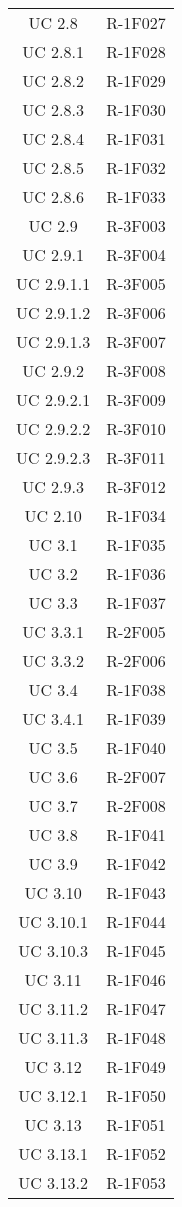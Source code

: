 \begin{tabularx}{\textwidth}{c|c}
		UC 2.8 & R-1F027 \\
		UC 2.8.1 & R-1F028 \\
		UC 2.8.2 & R-1F029 \\
		UC 2.8.3 & R-1F030 \\
		UC 2.8.4 & R-1F031 \\
		UC 2.8.5 & R-1F032 \\
		UC 2.8.6 & R-1F033 \\
		UC 2.9 & R-3F003 \\
		UC 2.9.1 & R-3F004 \\
		UC 2.9.1.1 & R-3F005 \\
		UC 2.9.1.2 & R-3F006 \\
		UC 2.9.1.3 & R-3F007 \\
		UC 2.9.2 & R-3F008 \\
		UC 2.9.2.1 & R-3F009 \\
		UC 2.9.2.2 & R-3F010 \\
		UC 2.9.2.3 & R-3F011 \\
		UC 2.9.3 & R-3F012 \\
		UC 2.10 & R-1F034 \\
		UC 3.1 & R-1F035 \\
		UC 3.2 & R-1F036 \\
		UC 3.3 & R-1F037 \\
		UC 3.3.1 & R-2F005 \\
		UC 3.3.2 & R-2F006 \\
		UC 3.4 & R-1F038 \\
		UC 3.4.1 & R-1F039 \\
		UC 3.5 & R-1F040 \\
		UC 3.6 & R-2F007 \\
		UC 3.7 & R-2F008 \\
		UC 3.8 & R-1F041 \\
		UC 3.9 & R-1F042 \\
		UC 3.10 & R-1F043 \\
		UC 3.10.1 & R-1F044 \\
		UC 3.10.3 & R-1F045 \\
		UC 3.11 & R-1F046 \\
		UC 3.11.2 & R-1F047 \\
		UC 3.11.3 & R-1F048 \\
		UC 3.12 & R-1F049 \\
		UC 3.12.1 & R-1F050 \\
		UC 3.13 & R-1F051 \\
		UC 3.13.1 & R-1F052 \\
		UC 3.13.2 & R-1F053 \\

\end{tabularx}
